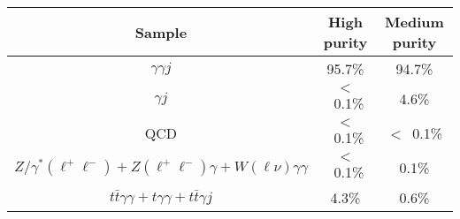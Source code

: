\begin{tabular}{|c|c|c|}
\hline
Sample & High purity & Medium purity\\
\hline
$\gamma\gamma j$                      & 95.7\%  &  94.7\%  \\
$\gamma j$                            & $<$~0.1\% &  4.6\%  \\ 
QCD                                   & $<$~0.1\% &  $<$~0.1\% \\ 
$Z/\gamma^*(\ell^+\ell^-) + Z(\ell^+\ell^-)\gamma + W(\ell\nu)\gamma\gamma$ & $<$~0.1\% &  0.1\% \\
$t\bar{t}\gamma\gamma + t\gamma\gamma + t\bar{t}\gamma j$ & 4.3\% &  0.6\%  \\
\hline
\end{tabular}
